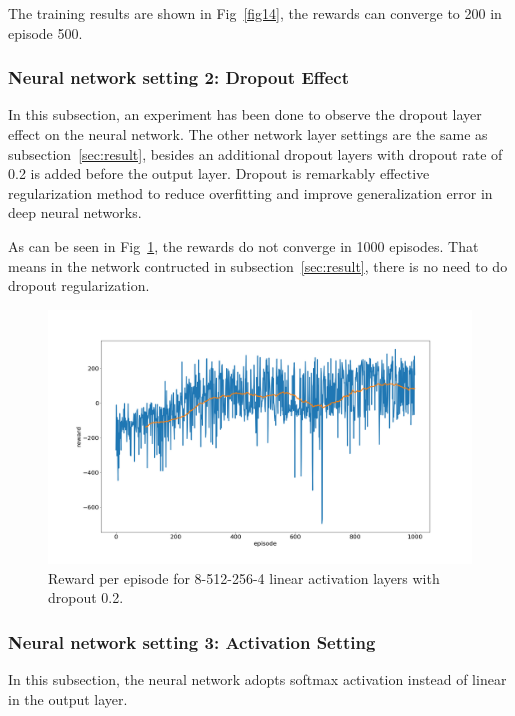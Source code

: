 \documentclass[conference]{IEEEtran}
\begin{document}
The training results are shown in Fig~\ref{fig14}, the rewards can converge to 200 in episode 500. 

\subsubsection{Neural network setting 2: Dropout Effect}\label{sec:dropout}

In this subsection, an experiment has been done to observe the dropout layer effect on the neural network. The other network layer settings are the same as subsection~\ref{sec:result}, besides an additional dropout layers with dropout rate of 0.2 is added before the output layer. Dropout is remarkably effective regularization method to reduce overfitting and improve generalization error in deep neural networks.

As can be seen in Fig~\ref{fig17}, the rewards do not converge in 1000 episodes. That means in the network contructed in subsection~\ref{sec:result}, there is no need to do dropout regularization.

\begin{figure}[ht]
\includegraphics[width=\linewidth]{train_dropout.png}
\caption{Reward per episode for 8-512-256-4 linear activation layers with dropout 0.2.}
\label{fig17}
\end{figure}

\subsubsection{Neural network setting 3: Activation Setting}\label{sec:softmax}

In this subsection, the neural network adopts softmax activation instead of linear in the output layer. 
\end{document}
